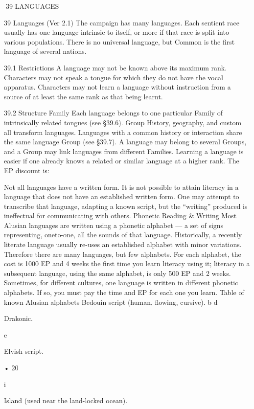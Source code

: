 \documentclass[a4paper]{article}
\begin{document}
\begin{multicols}{3}
39 LANGUAGES

39 Languages (Ver 2.1)
The campaign has many languages. Each sentient
race usually has one language intrinsic to itself, or
more if that race is split into various populations.
There is no universal language, but Common is the
first language of several nations.

39.1 Restrictions
A language may not be known above its maximum
rank. Characters may not speak a tongue for which
they do not have the vocal apparatus. Characters
may not learn a language without instruction from
a source of at least the same rank as that being
learnt.

39.2 Structure
Family Each language belongs to one particular
Family of intrinsically related tongues (see §39.6).
Group History, geography, and custom all transform languages. Languages with a common history
or interaction share the same language Group (see
§39.7). A language may belong to several Groups,
and a Group may link languages from different
Families.
Learning a language is easier if one already knows
a related or similar language at a higher rank. The
EP discount is:

Not all languages have a written form. It is not
possible to attain literacy in a language that does
not have an established written form. One may
attempt to transcribe that language, adapting a
known script, but the “writing” produced is ineffectual for communicating with others.
Phonetic Reading & Writing
Most Alusian languages are written using a phonetic alphabet — a set of signs representing, oneto-one, all the sounds of that language. Historically, a recently literate language usually re-uses an
established alphabet with minor variations. Therefore there are many languages, but few alphabets.
For each alphabet, the cost is 1000 EP and 4 weeks
the first time you learn literacy using it; literacy in
a subsequent language, using the same alphabet, is
only 500 EP and 2 weeks. Sometimes, for different
cultures, one language is written in different phonetic alphabets. If so, you must pay the time and
EP for each one you learn.
Table of known Alusian alphabets
Bedouin script (human, flowing, cursive).
b
d

Drakonic.

e

Elvish script.

• 20%

i

Island (used near the land-locked ocean).


\end{multicols}
\end{document}
